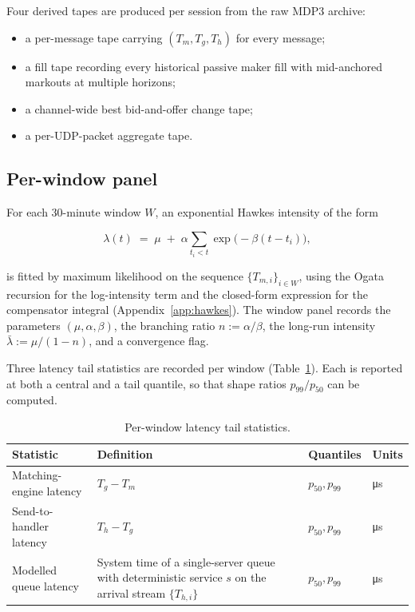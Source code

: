 \documentclass[11pt]{article}
\begin{document}
Four derived tapes are produced per session from the raw MDP3 archive:

\begin{itemize}
    \item a per-message tape carrying $(T_m, T_g, T_h)$ for every message;
    \item a fill tape recording every historical passive maker fill with mid-anchored markouts at multiple horizons;
    \item a channel-wide best bid-and-offer change tape;
    \item a per-UDP-packet aggregate tape.
\end{itemize}

\subsection{Per-window panel}
\label{sec:panel}

For each 30-minute window $W$, an exponential Hawkes intensity of the form

\begin{equation}
\label{eq:hawkes}
\lambda(t) \;=\; \mu \;+\; \alpha \sum_{t_i < t} \exp\bigl(-\beta (t - t_i)\bigr),
\end{equation}

is fitted by maximum likelihood on the sequence $\{T_{m,i}\}_{i \in W}$, using the Ogata recursion for the log-intensity term and the closed-form expression for the compensator integral (Appendix~\ref{app:hawkes}). The window panel records the parameters $(\mu, \alpha, \beta)$, the branching ratio $n := \alpha / \beta$, the long-run intensity $\bar\lambda := \mu / (1 - n)$, and a convergence flag.

Three latency tail statistics are recorded per window (Table~\ref{tab:panel}). Each is reported at both a central and a tail quantile, so that shape ratios $p_{99}/p_{50}$ can be computed.

\begin{table}[htbp]
\centering
\caption{Per-window latency tail statistics.}
\label{tab:panel}
\begin{tabularx}{\textwidth}{@{}l X l l@{}}
\toprule
Statistic & Definition & Quantiles & Units \\
\midrule
Matching-engine latency & $T_g - T_m$ & $p_{50}, p_{99}$ & \si{\micro\second} \\
Send-to-handler latency & $T_h - T_g$ & $p_{50}, p_{99}$ & \si{\micro\second} \\
Modelled queue latency & System time of a single-server queue with deterministic service $s$ on the arrival stream $\{T_{h,i}\}$ & $p_{50}, p_{99}$ & \si{\micro\second} \\
\bottomrule
\end{tabularx}
\end{table}
\end{document}
